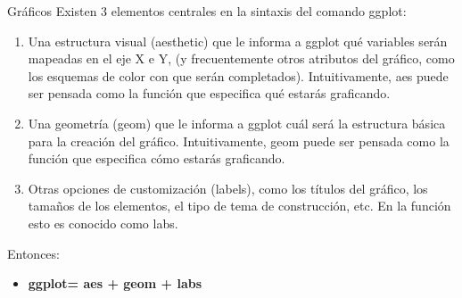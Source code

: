 \documentclass[
  8pt,
  ignorenonframetext,
]{beamer}
\providecommand{\tightlist}{%
  \setlength{\itemsep}{0pt}\setlength{\parskip}{0pt}}
\begin{document}
\begin{frame}{Gráficos}
\protect\hypertarget{gruxe1ficos-1}{}
Existen 3 elementos centrales en la sintaxis del comando ggplot:

\begin{enumerate}
\item
  Una estructura visual (aesthetic) que le informa a ggplot qué
  variables serán mapeadas en el eje X e Y, (y frecuentemente otros
  atributos del gráfico, como los esquemas de color con que serán
  completados). Intuitivamente, aes puede ser pensada como la función
  que especifica qué estarás graficando.
\item
  Una geometría (geom) que le informa a ggplot cuál será la estructura
  básica para la creación del gráfico. Intuitivamente, geom puede ser
  pensada como la función que especifica cómo estarás graficando.
\item
  Otras opciones de customización (labels), como los títulos del
  gráfico, los tamaños de los elementos, el tipo de tema de
  construcción, etc. En la función esto es conocido como labs.
\end{enumerate}

Entonces:

\begin{itemize}
\tightlist
\item
  \textbf{ggplot= aes + geom + labs}
\end{itemize}
\end{frame}
\end{document}
